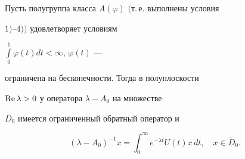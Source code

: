 \begin{lem}


Пусть полугруппа класса $A(\varphi)$ $($т.\,е. выполнены условия


$1)$--$4))$ удовлетворяет условиям


$\int\limits^{1}_{0}\varphi(t)dt<\infty$, $\varphi(t)$ ---


ограничена на бесконечности. Тогда в полуплоскости


$\operatorname{Re} \lambda > 0$ у оператора $\lambda-A_{0}$ на множестве


$\overline{D}_{0}$ имеется ограниченный обратный оператор и


\begin{equation}


(\lambda-A_{0})^{-1}x=


\int^{\infty}_{0} e^{-\lambda t} U(t) x\,dt, \quad x\in \overline{D}_{0}.


\end{equation}


\end{lem}








